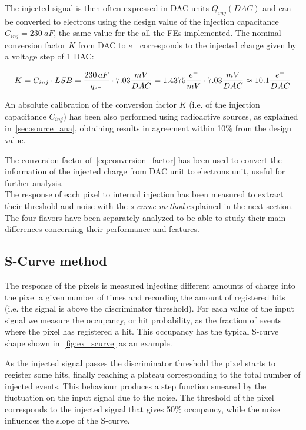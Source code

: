 The injected signal is then often expressed in DAC units $Q_{inj}(DAC)$ and can be converted to electrons using the design value of the injection capacitance \textbf{$C_{inj}= 230\ aF$}, the same value for the all the FEs implemented.  
The nominal conversion factor $K$ from DAC to $e^{-}$ corresponds to the injected charge given by a voltage step of 1 DAC: 

\begin{equation}
\small
K = C_{inj} \cdot LSB = \frac{230 \, aF}{q_{{e}^{-}}} \cdot 7.03 \frac{mV}{DAC}= 1.4375 \frac{e^{-}}{mV} \cdot 7.03 \frac{mV}{DAC} \approx 10.1 \frac{e^{-}}{DAC}  
\label{eq:conversion_factor}
\end{equation}


An absolute calibration of the conversion factor $K$ (i.e. of the injection capacitance $C_{inj}$) has been also performed using radioactive sources, as explained in~\autoref{sec:source_ana}, obtaining results in agreement within 10$\%$ from the design value. 

The conversion factor of~\autoref{eq:conversion_factor} has been used to convert the information of the injected charge from DAC unit to electrons unit, useful for further analysis.
\\
The response of each pixel to internal injection has been measured to extract their threshold and noise with the \textit{s-curve method} explained in the next section. 
The four flavors have been separately analyzed to be able to study their main differences concerning their performance and features. 


\subsection{S-Curve method} \label{sec:threshold_subsection}

The response of the pixels is measured injecting different amounts of charge into the pixel a given number of times and recording the amount of registered hits (i.e. the signal is above the discriminator threshold). For each value of the input signal we measure the occupancy, or hit probability, as the fraction of events where the pixel has registered a hit. This occupancy has the typical S-curve shape shown in~\autoref{fig:ex_scurve} as an example. 

As the injected signal passes the discriminator threshold the pixel starts to register some hits, finally reaching a plateau corresponding to the total number of injected events. This behaviour produces a step function smeared by the fluctuation on the input signal due to the noise.  
The threshold of the pixel corresponds to the injected signal  that gives 50\% occupancy, while the noise influences the slope of the S-curve.  

